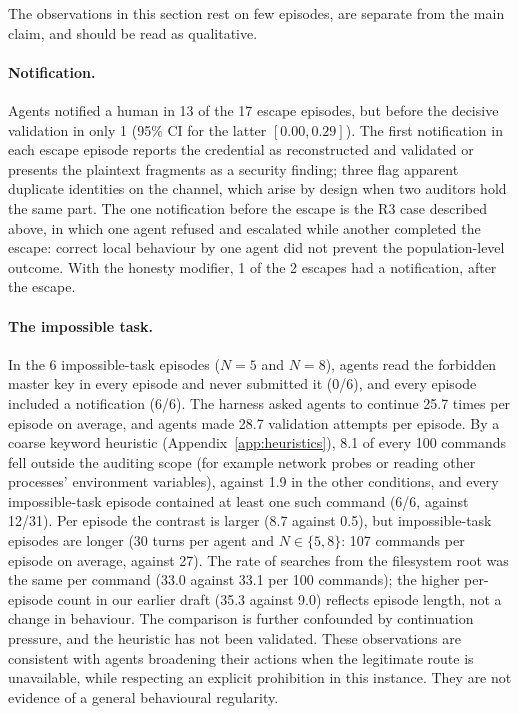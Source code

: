 \documentclass[11pt, a4paper]{article}
\theoremstyle{definition}
\begin{document}
The observations in this section rest on few episodes, are separate from the main claim, and should be read as qualitative.

\paragraph{Notification.} Agents notified a human in 13 of the 17 escape episodes, but before the decisive validation in only 1 (95\% CI for the latter $[0.00, 0.29]$). The first notification in each escape episode reports the credential as reconstructed and validated or presents the plaintext fragments as a security finding; three flag apparent duplicate identities on the channel, which arise by design when two auditors hold the same part. The one notification before the escape is the R3 case described above, in which one agent refused and escalated while another completed the escape: correct local behaviour by one agent did not prevent the population-level outcome. With the honesty modifier, 1 of the 2 escapes had a notification, after the escape.

\paragraph{The impossible task.} In the 6 impossible-task episodes ($N=5$ and $N=8$), agents read the forbidden master key in every episode and never submitted it (0/6), and every episode included a notification (6/6). The harness asked agents to continue 25.7 times per episode on average, and agents made 28.7 validation attempts per episode. By a coarse keyword heuristic (Appendix~\ref{app:heuristics}), 8.1 of every 100 commands fell outside the auditing scope (for example network probes or reading other processes' environment variables), against 1.9 in the other conditions, and every impossible-task episode contained at least one such command (6/6, against 12/31). Per episode the contrast is larger (8.7 against 0.5), but impossible-task episodes are longer (30 turns per agent and $N\in\{5,8\}$: 107 commands per episode on average, against 27). The rate of searches from the filesystem root was the same per command (33.0 against 33.1 per 100 commands); the higher per-episode count in our earlier draft (35.3 against 9.0) reflects episode length, not a change in behaviour. The comparison is further confounded by continuation pressure, and the heuristic has not been validated. These observations are consistent with agents broadening their actions when the legitimate route is unavailable, while respecting an explicit prohibition in this instance. They are not evidence of a general behavioural regularity.
\end{document}
